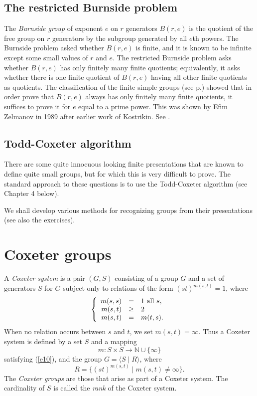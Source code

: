 \documentclass[a4paper,11pt,final,openany]{memoir}%
\theoremstyle{nonumberplain}
\begin{document}
\subsection{The restricted Burnside problem%
%
}

The \emph{Burnside group}%
of exponent $e$ on $r$ generators $B(r,e)$ is the quotient of the free group
on $r$ generators by the subgroup generated by all $e$th powers. The Burnside
problem asked whether $B(r,e)$ is finite, and it is known to be infinite
except some small values of $r$ and $e$. The restricted Burnside problem asks
whether $B(r,e)$ has only finitely many finite quotients; equivalently, it
asks whether there is one finite quotient of $B(r,e)$ having all other finite
quotients as quotients. The classification of the finite simple groups (see
p.\thinspace\pageref{classification}) showed that in order prove that $B(r,e)$
always has only finitely many finite quotients, it suffices to prove it for
$e$ equal to a prime power. This was shown by Efim Zelmanov in 1989 after
earlier work of Kostrikin. See \cite{feit1995}.

\subsection{Todd-Coxeter algorithm%
%
}

There are some quite innocuous looking finite presentations that are known to
define quite small groups, but for which this is very difficult to prove. The
standard approach to these questions is to use the Todd-Coxeter algorithm (see
Chapter 4 below).

We shall develop various methods for recognizing groups from their
presentations (see also the exercises).

\section{Coxeter groups}

A \emph{Coxeter system}%
is a pair $(G,S)$ consisting of a group $G$ and a set of generators $S$ for
$G$ subject only to relations of the form $(st)^{m(s,t)}=1$, where
\begin{equation}
\left\{
\begin{array}
[c]{rcl}%
m(s,s) & = & 1\text{ all }s,\\
m(s,t) & \geq & 2\\
m(s,t) & = & m(t,s).
\end{array}
\right.  \label{e10}%
\end{equation}
When no relation occurs between $s$ and $t$, we set $m(s,t)=\infty$. Thus a
Coxeter system is defined by a set $S$ and a mapping%
\[
m\colon S\times S\rightarrow\mathbb{N}{}\cup\{\infty\}
\]
satisfying (\ref{e10}), and the group $G=\langle S\mid R\rangle$, where%
\[
R=\{(st)^{m(s,t)}\mid m(s,t)\neq\infty\}\text{.}%
\]
The \emph{Coxeter groups}%
%
\emph{ }are those that arise as part of a Coxeter system. The cardinality of
$S$ is called the \emph{rank}%
of the Coxeter system.
\end{document}
